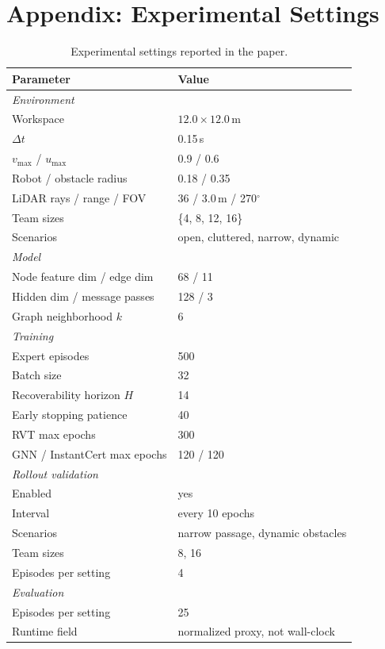 \documentclass[journal]{IEEEtran}
\begin{document}



\appendix

\section*{Appendix: Experimental Settings}
\label{app:hyperparams}

\begin{table}[H]
\centering
\caption{Experimental settings reported in the paper.}
\label{tab:hyperparams}
\scriptsize
\begin{tabular}{ll}
\toprule
\textbf{Parameter} & \textbf{Value} \\
\midrule
\multicolumn{2}{l}{\emph{Environment}} \\
Workspace & $12.0 \times 12.0$\,m \\
$\Delta t$ & 0.15\,s \\
$v_{\max}$ / $u_{\max}$ & 0.9 / 0.6 \\
Robot / obstacle radius & 0.18 / 0.35 \\
LiDAR rays / range / FOV & 36 / 3.0\,m / 270$^\circ$ \\
Team sizes & \{4, 8, 12, 16\} \\
Scenarios & open, cluttered, narrow, dynamic \\
\midrule
\multicolumn{2}{l}{\emph{Model}} \\
Node feature dim / edge dim & 68 / 11 \\
Hidden dim / message passes & 128 / 3 \\
Graph neighborhood $k$ & 6 \\
\midrule
\multicolumn{2}{l}{\emph{Training}} \\
Expert episodes & 500 \\
Batch size & 32 \\
Recoverability horizon $H$ & 14 \\
Early stopping patience & 40 \\
RVT max epochs & 300 \\
GNN / InstantCert max epochs & 120 / 120 \\
\midrule
\multicolumn{2}{l}{\emph{Rollout validation}} \\
Enabled & yes \\
Interval & every 10 epochs \\
Scenarios & narrow passage, dynamic obstacles \\
Team sizes & 8, 16 \\
Episodes per setting & 4 \\
\midrule
\multicolumn{2}{l}{\emph{Evaluation}} \\
Episodes per setting & 25 \\
Runtime field & normalized proxy, not wall-clock \\
\bottomrule
\end{tabular}
\end{table}
\end{document}
